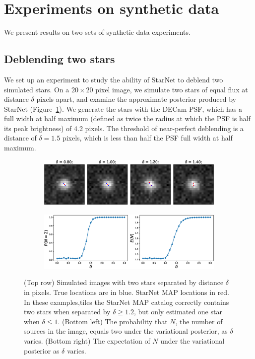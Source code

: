 \section{Experiments on synthetic data}

We present results on two sets of synthetic data experiments.

\subsection{Deblending two stars}

We set up an experiment to study the
ability of StarNet to deblend two simulated stars.
On a $20\times20$ pixel image,
we simulate two stars of equal flux at distance $\delta$ pixels apart, and
examine the approximate posterior produced by StarNet (Figure~\ref{fig:deblending_fig}).
We generate the stars with the DECam PSF, which 
has a full width at half maximum 
(defined as twice the radius at which the PSF is half its peak brightness) of 4.2 pixels. 
The threshold of near-perfect deblending is a distance of $\delta = 1.5$ pixels, which is less than half the PSF 
full width at half maximum. 

\begin{figure}[tb]
    \centering
    \begin{subfigure}{0.8\textwidth}
        \includegraphics[width=\textwidth]{figures_vg/deblending/example_deblending.eps}
    \end{subfigure}
    \begin{subfigure}{0.8\textwidth}
        \includegraphics[width=\textwidth]{figures_vg/deblending/summary_statistics.eps}
    \end{subfigure}
    \caption{(Top row) Simulated images with two stars separated by distance $\delta$ in pixels.
    True locations are in blue. StarNet MAP locations in red. 
    In these examples,tiles the StarNet MAP catalog correctly contains two stars when separated by $\delta \geq 1.2$,
    but only estimated one star when $\delta \leq 1$.
    (Bottom left) The probability that $N$, the number of sources in the image, equals two
    under the variational posterior, as $\delta$ varies.
    (Bottom right) The expectation of $N$ under the variational posterior as $\delta$ varies. }
    \label{fig:deblending_fig}
\end{figure}

